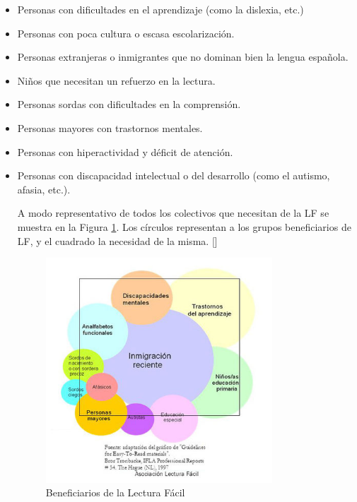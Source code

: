 \begin{itemize}
	\item Personas con dificultades en el aprendizaje (como la dislexia, etc.)	 
	\item Personas con poca cultura o escasa escolarización.	 
	\item Personas extranjeras o inmigrantes que no dominan bien la lengua española.
	\item Niños que necesitan un refuerzo en la lectura.
	\item Personas sordas con dificultades en la comprensión.
	\item Personas mayores con trastornos mentales.
	\item Personas con hiperactividad y  déficit de atención. 
	\item Personas con discapacidad intelectual o del desarrollo (como el autismo, afasia, etc.). 
	
	A modo representativo de todos los colectivos que necesitan de la LF se muestra en la Figura \ref{fig:destinatarios}. Los círculos representan a los grupos beneficiarios de LF, y el cuadrado la necesidad de la misma. [\cite{nomura2010guidelines}]
	\begin{figure}[htb]
		\centering
		\includegraphics[width=0.8\textwidth]{Imagenes/Ejemplos/destinatarios}
		\caption{Beneficiarios de la Lectura Fácil}
		\label{fig:destinatarios}
	\end{figure}
	

	
\end{itemize}


